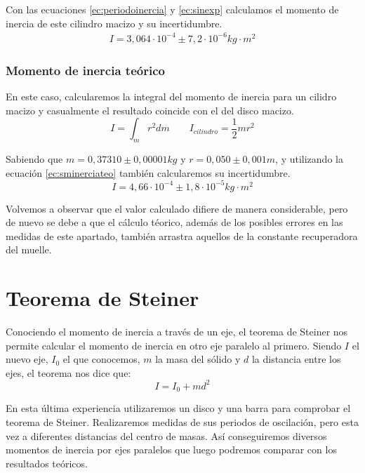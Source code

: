 \documentclass[12pt, a4paper, titlepage]{article}
\begin{document}
  Con las ecuaciones \ref{ec:periodoinercia} y \ref{ec:sinexp} calculamos el momento de inercia de este cilindro macizo y su incertidumbre.
  \begin{gather*}
    I = 3,064 \cdot 10^{-4} \pm 7,2 \cdot 10^{-6} kg \cdot m^2
  \end{gather*}

  \subsubsection{Momento de inercia teórico}

  En este caso, calcularemos la integral del momento de inercia para un cilidro macizo y casualmente el resultado coincide con el del disco macizo.
  \begin{equation}
    I = \int_m{r^2 dm} \qquad I_{cilindro} = \frac{1}{2} m r^2
  \end{equation}

  Sabiendo que $m = 0,37310 \pm 0,00001 kg$ y $r = 0,050 \pm 0,001 m$, y utilizando la ecuación \ref{ec:sminerciateo} también calcularemos su incertidumbre.
  \begin{equation*}
    I = 4,66 \cdot 10^{-4} \pm 1,8 \cdot 10^{-5} kg \cdot m^2
  \end{equation*}

  Volvemos a observar que el valor calculado difiere de manera considerable, pero de nuevo se debe a que el cálculo téorico, además de los posibles errores en las medidas de este apartado, también arrastra aquellos de la constante recuperadora del muelle.


  \newpage
  \section{Teorema de Steiner}

  Conociendo el momento de inercia a través de un eje, el teorema de Steiner nos permite calcular el momento de inercia en otro eje paralelo al primero. Siendo $I$ el nuevo eje, $I_0$ el que conocemos, $m$ la masa del sólido y $d$ la distancia entre los ejes, el teorema nos dice que:
  \begin{equation}
    I = I_0 + md^2 \label{ec:steiner}
  \end{equation}

  En esta última experiencia utilizaremos un disco y una barra para comprobar el teorema de Steiner. Realizaremos medidas de sus periodos de oscilación, pero esta vez a diferentes distancias del centro de masas. Así conseguiremos diversos momentos de inercia por ejes paralelos que luego podremos comparar con los resultados teóricos.
\end{document}
